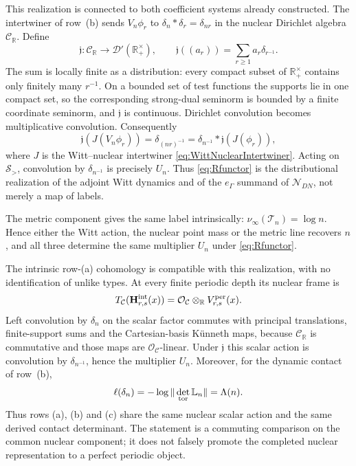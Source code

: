 \documentclass[11pt]{amsart}
\theoremstyle{definition}
\theoremstyle{remark}
\newcommand{\R}{\mathbb R}
\begin{document}
This realization is connected to both coefficient systems already
constructed.  The intertwiner of row~(b) sends
$V_n\phi_r$ to $\delta_n*\delta_r=\delta_{nr}$ in the nuclear Dirichlet
algebra $\mathcal C_{\R}$.  Define
\begin{equation}\label{eq:DirichletDistributionMap}
 \mathfrak j:\mathcal C_{\R}\longrightarrow
 \mathcal D'(\R_+^\times),\qquad
 \mathfrak j((a_r))=\sum_{r\geq1}a_r\delta_{r^{-1}}.
\end{equation}
The sum is locally finite as a distribution: every compact subset of
$\R_+^\times$ contains only finitely many $r^{-1}$.  On a bounded set of
test functions the supports lie in one compact set, so the corresponding
strong-dual seminorm is bounded by a finite coordinate seminorm, and
$\mathfrak j$ is continuous.  Dirichlet convolution becomes multiplicative
convolution.  Consequently
\begin{equation}\label{eq:fullintertwiner}
 \mathfrak j(J(V_n\phi_r))
 =\delta_{(nr)^{-1}}
 =\delta_{n^{-1}}*\mathfrak j(J(\phi_r)),
\end{equation}
where $J$ is the Witt--nuclear intertwiner
\eqref{eq:WittNuclearIntertwiner}.  Acting on $\mathcal S_>$, convolution by
$\delta_{n^{-1}}$ is precisely $U_n$.  Thus \eqref{eq:Rfunctor} is the
distributional realization of the adjoint Witt dynamics and of the
$e_\Gamma$ summand of $\mathcal N_{DN}$, not merely a map of labels.

The metric component gives the same label intrinsically:
$\nu_\infty(\mathcal T_n)=\log n$.  Hence either the Witt action, the
nuclear point mass or the metric line recovers $n$, and all three determine
the same multiplier $U_n$ under \eqref{eq:Rfunctor}.

The intrinsic row-(a) cohomology is compatible with this realization, with
no identification of unlike types.  At every finite periodic depth its
nuclear frame is
\[
 T_{\mathcal C}(\mathbf H_{r,s}^{\rm int}(x))
 =\mathcal O_{\mathcal C}\otimes_\R V_{r,s}^{\rm per}(x).
\]
Left convolution by $\delta_n$ on the scalar factor commutes with principal
translations, finite-support sums and the Cartesian-basis K\"unneth maps,
because $\mathcal C_{\R}$ is commutative and those maps are
$\mathcal O_{\mathcal C}$-linear.  Under $\mathfrak j$ this scalar action is
convolution by $\delta_{n^{-1}}$, hence the multiplier $U_n$.  Moreover,
for the dynamic contact of row~(b),
\begin{equation}\label{eq:ABCcompatibility}
 \ell(\delta_n)
 =-\log\|\det_{\rm tor}\mathbb L_n\|
 =\Lambda(n).
\end{equation}
Thus rows (a), (b) and (c) share the same nuclear scalar action and the same
derived contact determinant.  The statement is a commuting comparison on
the common nuclear component; it does not falsely promote the completed
nuclear representation to a perfect periodic object.
\end{document}
